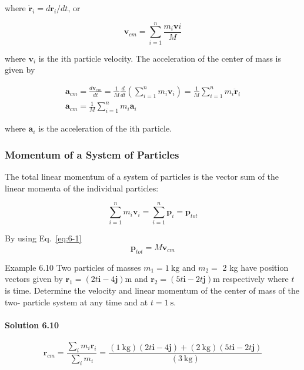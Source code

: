 \documentclass[10pt]{article}
\numberwithin{equation}{section}
\begin{document}
where $\dot{\mathbf{r}}_{i}=d \mathbf{r}_{i} / d t$, or


\begin{equation}
\mathbf{v}_{c m}=\sum_{i=1}^{n} \frac{m_{i} \mathbf{v} i}{M} \label{eq:6-1}
\end{equation}


where $\mathbf{v}_{i}$ is the ith particle velocity. The acceleration of the center of mass is given by


\begin{gather}
\mathbf{a}_{c m}=\frac{d \mathbf{v}_{c m}}{d t}=\frac{1}{M} \frac{d}{d t}\left(\sum_{i=1}^{n} m_{i} \mathbf{v}_{i}\right)=\frac{1}{M} \sum_{i=1}^{n} m_{i} \ddot{\mathbf{r}}_{i} \\
\mathbf{a}_{c m}=\frac{1}{M} \sum_{i=1}^{n} m_{i} \mathbf{a}_{i} \label{eq:6-2}
\end{gather}


where $\mathbf{a}_{i}$ is the acceleration of the ith particle.

\subsubsection{Momentum of a System of Particles}\label{sec:6-3-6}
The total linear momentum of a system of particles is the vector sum of the linear momenta of the individual particles:


\begin{equation}
\sum_{i=1}^{n} m_{i} \mathbf{v}_{i}=\sum_{i=1}^{n} \mathbf{p}_{i}=\mathbf{p}_{t o t} \label{eq:6-3}
\end{equation}


By using Eq.~\eqref{eq:6-1}\begin{equation}
\mathbf{p}_{t o t}=M \mathbf{v}_{c m} \label{eq:6-4}
\end{equation}


Example 6.10 Two particles of masses $m_{1}=1 \mathrm{~kg}$ and $m_{2}=$ 2 kg have position vectors given by $\mathbf{r}_{1}=(2 t \mathbf{i}-4 \mathbf{j}) \mathrm{m}$ and $\mathbf{r}_{2}=(5 t \mathbf{i}-2 t \mathbf{j}) \mathrm{m}$ respectively where $t$ is time. Determine the velocity and linear momentum of the center of mass of the two- particle system at any time and at $t=1 \mathrm{~s}$.

\paragraph*{Solution 6.10}
$$
\mathbf{r}_{c m}=\frac{\sum_{i} m_{i} \mathbf{r}_{i}}{\sum_{i} m_{i}}=\frac{(1 \mathrm{~kg})(2 t \mathbf{i}-4 \mathbf{j})+(2 \mathrm{~kg})(5 t \mathbf{i}-2 t \mathbf{j})}{(3 \mathrm{~kg})}
$$
\end{document}

